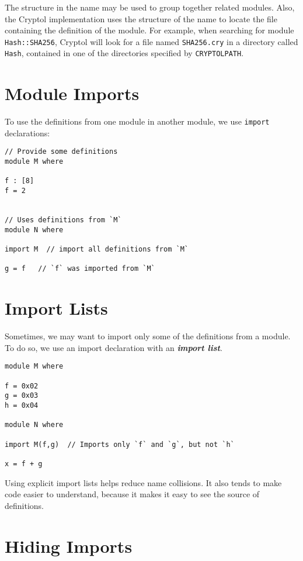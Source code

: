 The structure in the name may be used to group together related modules.
Also, the Cryptol implementation uses the structure of the name to
locate the file containing the definition of the module. For example,
when searching for module \texttt{Hash::SHA256}, Cryptol will look for a
file named \texttt{SHA256.cry} in a directory called \texttt{Hash},
contained in one of the directories specified by \texttt{CRYPTOLPATH}.

\section{Module Imports}\label{module-imports}

To use the definitions from one module in another module, we use
\texttt{import} declarations:

\begin{verbatim}
// Provide some definitions
module M where

f : [8]
f = 2


// Uses definitions from `M`
module N where

import M  // import all definitions from `M`

g = f   // `f` was imported from `M`
\end{verbatim}

\section{Import Lists}\label{import-lists}

Sometimes, we may want to import only some of the definitions from a
module. To do so, we use an import declaration with an
\textbf{\emph{import list}}.

\begin{verbatim}
module M where

f = 0x02
g = 0x03
h = 0x04

module N where

import M(f,g)  // Imports only `f` and `g`, but not `h`

x = f + g
\end{verbatim}

Using explicit import lists helps reduce name collisions. It also tends
to make code easier to understand, because it makes it easy to see the
source of definitions.

\section{Hiding Imports}\label{hiding-imports}


